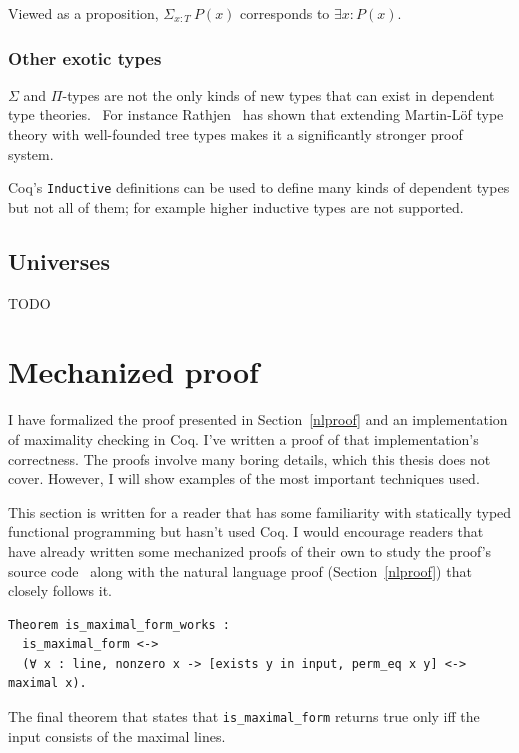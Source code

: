 \documentclass[english, 12pt, a4paper, sci, a-1b, online]{aaltothesis}
\newcommand\icoq[1]{\texttt{#1}}
\begin{document}
Viewed as a proposition, $\Sigma_{x:T}~P(x)$ corresponds to $\exists x : P(x)$.

\subsubsection{Other exotic types}

$\Sigma$ and $\Pi$-types are not the only kinds of new types that can exist in dependent type theories.~\cite{hofmann1997syntax} For instance Rathjen~\cite{griffor1994strength} has shown that extending Martin-Löf type theory with well-founded tree types makes it a significantly stronger proof system.

Coq's \icoq{Inductive} definitions can be used to define many kinds of dependent types but not all of them; for example higher inductive types are not supported.

\subsection{Universes}

TODO

\section{Mechanized proof}\label{mechproof}

I have formalized the proof presented in Section~\ref{nlproof} and an implementation of maximality checking in Coq. I've written a proof of that implementation's correctness. The proofs involve many boring details, which this thesis does not cover. However, I will show examples of the most important techniques used.

This section is written for a reader that has some familiarity with statically typed functional programming but hasn't used Coq. I would encourage readers that have already written some mechanized proofs of their own to study the proof's source code~\cite{source_code} along with the natural language proof (Section~\ref{nlproof}) that closely follows it.

\begin{listing}[h]
\begin{verbatim}
Theorem is_maximal_form_works :
  is_maximal_form <->
  (∀ x : line, nonzero x -> [exists y in input, perm_eq x y] <-> maximal x).
\end{verbatim}
\caption{The final theorem that states that \icoq{is_maximal_form} returns true only iff the input consists of the maximal lines.}
\end{listing}
\end{document}
